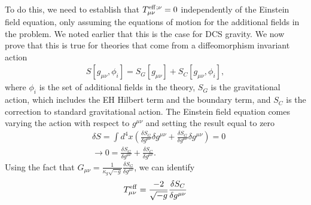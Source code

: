 \documentclass[aps,prd,amsmath,showpacs,amssymb,superscriptaddress,nofootinbib,longbibliography,eqsecnum,preprintnumbers]{revtex4-1}
\begin{document}
To do this, we need to establish that $T_{\mu\nu}^{\rm eff}{}^{;\nu}=0$ independently of the Einstein field equation, only assuming the equations of motion for the additional fields in the problem. We noted earlier that this is the case for DCS gravity. We now prove that this is true for theories that come from a diffeomorphism invariant action 
\begin{align}
S[g_{\mu\nu},\phi_i]=S_G[g_{\mu\nu}]+S_C[g_{\mu \nu} ,\phi_i],
\end{align}
where $\phi_i$ is the set of additional fields in the theory, $S_G$ is the gravitational action, which includes the EH Hilbert term and the boundary term, and $S_C$ is the correction to standard gravitational action. The Einstein field equation comes varying the action with respect to $g^{\mu \nu}$ and setting the result equal to zero
\begin{align}
&\delta S =\int d^4x\left(\frac{\delta S_G}{\delta g^{\mu \nu}}\delta g^{\mu\nu}+\frac{\delta S_G}{\delta g^{\mu \nu}}\delta g^{\mu\nu}\right) =0 \nonumber \\
&\to 0= \frac{\delta S_G}{\delta g^{\mu \nu}}+ \frac{\delta S_C}{\delta g^{\mu \nu}}.
\end{align}
Using the fact that $G_{\mu \nu}=\frac{1}{\kappa_g \sqrt{-g}}\frac{\delta S_G}{\delta g^{\mu\nu}}$, we can identify
\begin{align}
T_{\mu \nu}^{\rm eff}=\frac{-2}{\sqrt{-g}}\frac{\delta S_C}{\delta g^{\mu \nu}}
\end{align}
\end{document}
